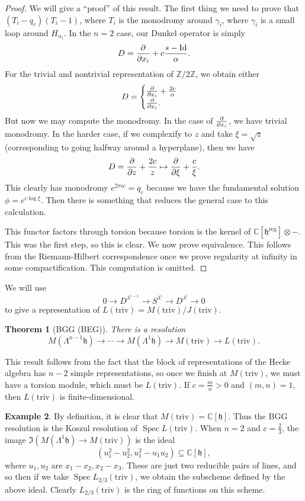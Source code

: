 \documentclass[leqno, openany]{memoir}
\newtheorem{thm}{Theorem}[section]
\theoremstyle{definition}
\newtheorem{exm}[thm]{Example}
\theoremstyle{remark}
\theoremstyle{plain}
\theoremstyle{definition}
\theoremstyle{remark}
\newcommand{\C}{\mathbb{C}}
\newcommand{\Z}{\mathbb{Z}}
\newcommand{\h}{\mathfrak{h}}
\newcommand{\mr}[1]{\mathrm{#1}}
\newcommand{\1}{\mathbf{1}}
\newcommand{\2}{\mathbf{2}}
\newcommand{\3}{\mathbf{3}}
\DeclareMathOperator{\Spec}{Spec}
\begin{document}
\begin{proof}
    We will give a ``proof'' of this result. The first thing we need to prove that $(T_i - q_c)(T_i - 1)$, where $T_i$ is the monodromy around $\gamma_i$, where $\gamma_i$ is a small loop around $H_{\alpha_i}$. In the $n=2$ case, our Dunkel operator is simply
    \[ D = \pdv{x_i} + c \frac{s - \mr{Id}}{\alpha}. \]
    For the trivial and nontrivial representation of $\Z/2\Z$, we obtain either
    \[ D = \begin{cases}
        \pdv{x_i} + \frac{2c}{\alpha} \\
        \pdv{x_i}.
    \end{cases}
    \]
    But now we may compute the monodromy. In the case of $\pdv{x_i}$, we have trivial monodromy. In the harder case, if we complexify to $z$ and take $\xi = \sqrt{z}$ (corresponding to going halfway around a hyperplane), then we have
    \[ D = \pdv{z} + \frac{2c}{z} \mapsto \pdv{\xi} + \frac{c}{\xi}. \]
    This clearly has monodromy $e^{2\pi i c} = q_c$ because we have the fundamental solution $\phi = e^{c \log \xi}$. Then there is something that reduces the general case to this calculation.

    This functor factors through torsion because torsion is the kernel of $\C[\h^{\mr{reg}}] \otimes -$. This was the first step, so this is clear. We now prove equivalence. This follows from the Riemann-Hilbert correspondence once we prove regularity at infinity in some compactification. This computation is omitted.
\end{proof}

We will use
\[ 0 \to D^{\lambda^{i-1}} \to S^{\lambda^i} \to D^{\lambda^i} \to 0 \]
to give a representation of $L(\mr{triv}) = M(\mr{triv}) / J(\mr{triv})$.

\begin{thm}[BGG (BEG)]
    There is a resolution
    \[ M(\Lambda^{n-1} \h) \to \cdots \to M(\Lambda^1 \h) \to M(\mr{triv}) \to L(\mr{triv}). \]
\end{thm}

This result follows from the fact that the block of representations of the Hecke algebra has $n-2$ simple representations, so once we finish at $M(\mr{triv})$, we must have a torsion module, which must be $L(\mr{triv})$. If $c = \frac{m}{n} > 0$ and $(m,n) = 1$, then $L(\mr{triv})$ is finite-dimensional.

\begin{exm}
    By definition, it is clear that $M(\mr{triv}) = \C[\h]$. Thus the BGG resolution is the Koszul resolution of $\Spec L(\mr{triv})$. When $n = 2$ and $c = \frac{2}{3}$, the image $\Im(M(\Lambda^1 \h)\to M(\mr{triv}))$ is the ideal 
    \[ (u_1^2 - u_2^2, u_1^2 - u_1 u_2) \subseteq \C[\h], \]
    where $u_1, u_2$ are $x_1 - x_2, x_2 - x_3$. These are just two reducible pairs of lines, and so then if we take $\Spec L_{2/3}(\mr{triv})$, we obtain the subscheme defined by the above ideal. Clearly $L_{2/3}(\mr{triv})$ is the ring of functions on this scheme.
\end{exm}
\end{document}
